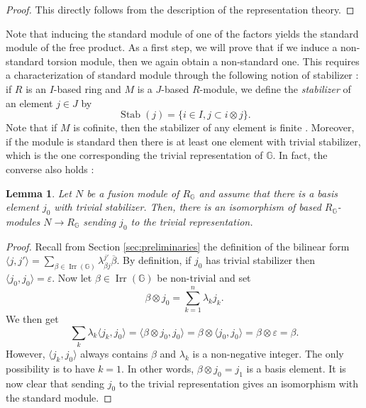 \documentclass[a4paper, 11pt]{amsart}
\theoremstyle{plain}
\newtheorem{lem}[thm]{Lemma}
\theoremstyle{definition}
\theoremstyle{remark}
\DeclareMathOperator{\Irr}{Irr}
\DeclareMathOperator{\Stab}{Stab}
\newcommand{\G}{\mathbb{G}}
\begin{document}
\begin{proof}
This directly follows from the description of the representation theory.
\end{proof}

Note that inducing the standard module of one of the factors yields the standard module of the free product. As a first step, we will prove that if we induce a non-standard torsion module, then we again obtain a non-standard one. This requires a characterization of standard module through the following notion of stabilizer : if $R$ is an $I$-based ring and $M$ is a $J$-based $R$-module, we define the \emph{stabilizer} of an element $j\in J$ by
\begin{equation*}
\Stab(j) = \{i\in I, j\subset i\otimes j\}.
\end{equation*}
Note that if $M$ is cofinite, then the stabilizer of any element is finite%
. Moreover, if the module is standard then there is at least one element with trivial stabilizer, which is the one corresponding the trivial representation of $\G$. In fact, the converse also holds :

\begin{lem}\label{lem:regularmodules}
Let $N$ be a fusion module of $R_{\G}$ and assume that there is a basis element $j_{0}$ with trivial stabilizer. Then, there is an isomorphism of based $R_{\G}$-modules $N\to R_{\G}$ sending $j_{0}$ to the trivial representation.
\end{lem}

\begin{proof}
Recall from Section \ref{sec:preliminaries} the definition of the bilinear form $\langle j, j'\rangle = \sum_{\beta\in \Irr(\G)}\lambda_{\beta j}^{j'}\overline{\beta}$. By definition, if $j_{0}$ has trivial stabilizer then $\langle j_{0}, j_{0}\rangle = \varepsilon$. Now let $\beta\in \Irr(\G)$ be non-trivial and set
\begin{equation*}
\beta\otimes j_{0} = \sum_{k=1}^{n} \lambda_{k}j_{k}.
\end{equation*}
We then get
\begin{equation*}
\sum_{k}\lambda_{k}\langle j_{k}, j_{0}\rangle = \langle \beta\otimes j_{0}, j_{0}\rangle = \beta\otimes \langle j_{0}, j_{0}\rangle = \beta\otimes \varepsilon = \beta.
\end{equation*}
However, $\langle j_{k}, j_{0}\rangle$ always contains $\beta$ and $\lambda_{k}$ is a non-negative integer. The only possibility is to have $k=1$. In other words, $\beta\otimes j_{0} = j_{1}$ is a basis element. It is now clear that sending $j_{0}$ to the trivial representation gives an isomorphism with the standard module.
\end{proof}
\end{document}
